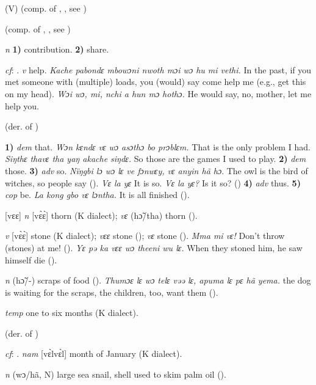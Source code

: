 \begin{letter}{(V)}
 (comp. of , , see ) 

 (comp. of , , see ) 

 \textit{n} \textbf{1)} contribution. \textbf{2)} share.

 \textit{cf}: . \textit{v} help. \textit{Kache pabondɛ mbowɔni nwoth mɔi wɔ hu mi vethi.} In the past, if you met someone with (multiple) loads, you (would) say come help me (e.g., get this on my head). \textit{Wɔi wɔ, mi, nchi a hun mɔ hothɔ.} He would say, no, mother, let me help you.

 (der. of ) 

 \textbf{1)} \textit{dem} that. \textit{Wɔn kɛndɛ vɛ wɔ asɔthɔ bo prɔblɛm.} That is the only problem I had. \textit{Siŋthɛ thavɛ tha yaŋ akache siŋdɛ.} So those are the games I used to play. \textbf{2)} \textit{dem} those. \textbf{3)} \textit{adv} so. \textit{Nïŋgbi lɔ wɔ lɛ ve fɔnwɛy, vɛ anyin hã hɔ}. The owl is the bird of witches, so people say (\citealt{Pichl1967}). \textit{Vɛ la yɛ} It is so. \textit{Vɛ la yɛ?} Is it so? (\citealt{Pichl1967}) \textbf{4)} \textit{adv} thus. \textbf{5)} \textit{cop} be. \textit{La kong gbo vɛ lɔntha.} It is all finished (\citealt{Pichl1967}). 

 [vɛɛ] \textit{n} [vɛ̀ɛ̀] thorn (K dialect); \textit{vɛ} (hɔ̃/tha) thorn (\citealt{Pichl1967}). 

 \textit{v} [vɛ̀ɛ̀] stone (K dialect); \textit{vɛɛ} stone (\citealt{Pichl1967}); \textit{vɛ} stone (\citealt{Sumner1921}). \textit{Mma mi vɛ!} Don't throw (stones) at me! (\citealt{Pichl1967}). \textit{Yɛ pə ka vɛɛ wɔ theeni wu lɛ.} When they stoned him, he saw himself die (\citealt{Pichl1967}). 

 \textit{n} (hɔ̃/-) scraps of food (\citealt{Pichl1967}). \textit{Thumɔɛ lɛ wɔ telɛ vəə lɛ, apuma lɛ pɛ hã yema.} the dog is waiting for the scraps, the children, too, want them (\citealt{Pichl1967}).

 \textit{temp} one to six months (K dialect). 

 (der. of ) 

 \textit{cf}: . \textit{nam} [vɛ̀lvɛ̀l] month of January (K dialect). 

 \textit{n} (wɔ/hã, N) large sea snail, shell used to skim palm oil (\citealt{Pichl1967}). 


\end{letter}
